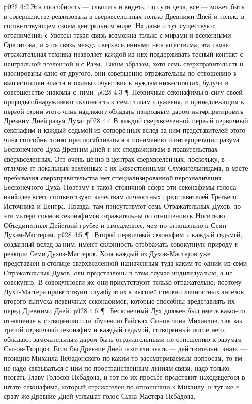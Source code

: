 \vs p028 4:2 Эта способность --- слышать и видеть, по сути дела, все --- может быть в совершенстве реализована в сверхвселенных только Древними Дней и только в соответствующем своем центральном мире. Но даже и тут существуют ограничения: с Уверсы такая связь возможна только с мирами и вселенными Орвонтона, и хотя связь между сверхвселенными неосуществима, эта самая отражательная техника позволяет каждой из них поддерживать тесный контакт с центральной вселенной и с Раем. Таким образом, хотя семь сверхправительств и изолированы одно от другого, они совершенно отражательны по отношению к вышестоящей власти и полны сочувствия к нуждам нижестоящих, будучи в совершенстве знакомы с ними.
\vs p028 4:3 \P\ Первичные секонафимы в силу своей природы обнаруживают склонность к семи типам служения, и принадлежащим к первой серии этого чина надлежит обладать природным даром интерпретировать Древним Дней разум Духа:
\vs p028 4:4 \bibnobreakspace {} В каждой сверхвселенной первый первичный секонафим и каждый седьмой из сотворенных вслед за ним представителей этого чина способны тонко приспосабливаться к пониманию и интерпретации разума Бесконечного Духа Древним Дней и их сподвижникам в правительствах сверхвселенных. Это очень ценно в центрах сверхвселенных, поскольку, в отличие от локальных вселенных с их Божественными Служительницами, в месте пребывания сверхправительства нет специализированной персонализации Бесконечного Духа. Поэтому в такой столичной сфере эти секонафимы\hyp{}голоса наиболее всего соответствуют качествам личностных представителей Третьего Источника и Центра. Правда, там присутствуют семь Отражательных Духов, но эти матери сонмов секонафимов отражательны по отношению к Носителю Объединенных Действий грубее и замедленнее, чем по отношению к Семи Духам\hyp{}Мастерам.
\vs p028 4:5 \P\ \bibnobreakspace {} Второй первичный секонафим и каждый седьмой, созданный вслед за ним, имеют склонность отображать совокупную природу и реакции Семи Духов\hyp{}Мастеров. Хотя каждый из Духов\hyp{}Мастеров уже представлен в столице сверхвселенной назначенным туда каким\hyp{}то одним из семи Отражательных Духов, они представлены в этом случае индивидуально, а не совокупно. В совокупности же они присутствуют только отражательно; поэтому Духи\hyp{}Мастера приветствуют службу этих в высшей степени личностных ангелов, второго выпуска первичных секонафимов, которые способны представлять их перед Древними Дней.
\vs p028 4:6 \P\ \bibnobreakspace {} Бесконечный Дух должен был иметь какое\hyp{}то отношение к сотворению или обучению Райских Сынов чина Михаилов, так как третий первичный секонафим и каждый седьмой, сотворенный после него, обладают замечательным даром быть отражательными по отношению к разумам Сынов\hyp{}Творцов. Если бы Древние Дней захотели знать --- действительно знать --- позицию Михаила Небадонского по каким\hyp{}то рассматриваемым вопросам, то им не надо связываться с ним по пространственным линиям связи; надо только позвать Главу Голосов Небадона, и тот по их просьбе представит находящегося в штате секонафима, который отражателен по отношению к Михаилу; и тут же и сразу же Древние Дней услышат голос Сына\hyp{}Мастера Небадона.
